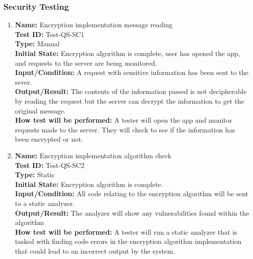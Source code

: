 \documentclass[12pt, titlepage]{article}
\begin{document}



\subsubsection{Security Testing}

\begin{enumerate}

    \item
    \textbf{Name:} Encryption implementation message reading \label{itm:Test-QS-SC1} \\
    \textbf{Test ID:} Test-QS-SC1 \\
    \textbf{Type:} Manual \\
    \textbf{Initial State:} Encryption algorithm is complete, user has opened the app, and requests to the server are being monitored. \\
    \textbf{Input/Condition:} A request with sensitive information has been sent to the sever. \\
    \textbf{Output/Result:} The contents of the information passed is not decipherable by reading the request but the server can decrypt the information to get the original message. \\
    \textbf{How test will be performed:} A tester will open the app and monitor requests made to the server. They will check to see if the information has been encrypted or not.

    \item
    \textbf{Name:} Encryption implementation algorithm check \label{itm:Test-QS-SC2} \\
    \textbf{Test ID:} Test-QS-SC2 \\
    \textbf{Type:} Static \\
    \textbf{Initial State:} Encryption algorithm is complete. \\
    \textbf{Input/Condition:} All code relating to the encryption algorithm will be sent to a static analyzer. \\
    \textbf{Output/Result:} The analyzer will show any vulnerabilities found within the algorithm \\
    \textbf{How test will be performed:} A tester will run a static analyzer that is tasked with finding code errors in the encryption algorithm implementation that could lead to an incorrect output by the system.


\end{enumerate}
\end{document}

